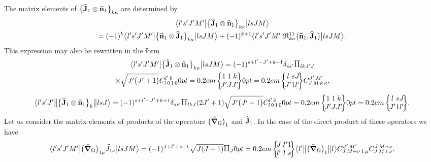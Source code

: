 The matrix elements of \(\bigl\{\widehat{\mathbf{J}}_{1} \otimes \widehat{\mathbf{n}}_{1}\bigr\}_{k \kappa}\) are determined by
\begin{multline}
\bigl\langle  l^{\prime} s^{\prime} J^{\prime} M^{\prime} \big| \bigl\{\widehat{\mathbf{J}}_{1} \otimes \widehat{\mathbf{n}}_{1}\bigr\}_{k \kappa} \big| l s J M \bigr\rangle\\
=(-1)^{k}
\bigl\langle  l^{\prime} s^{\prime} J^{\prime} M^{\prime} \big| \bigl\{\widehat{\mathbf{n}}_{1} \otimes \widehat{\mathbf{J}}_{1}\bigr\}_{k \kappa} \big| l s J M \bigr\rangle+(-1)^{k+1}
\bigl\langle  l^{\prime} s^{\prime} J^{\prime} M^{\prime} \big|  \mathfrak{R}_{k \kappa}^{11}\bigl(\widehat{\mathbf{n}}_{1}, \widehat{\mathbf{J}}_{1}\bigr) \big| l s J M \bigr\rangle . \label{eq:13:2:55}
\end{multline}
This expression may also be rewritten in the form
\begin{multline}
\braOket{ l^{\prime} s^{\prime} J^{\prime} M^{\prime}}{\bigl\{\widehat{\vect{J}}_{1} \otimes \widehat{\vect{n}}_{1}\bigr\}_{k \kappa}}{l s J M}= (-1)^{s+l^{\prime}-J^{\prime}+k+1} \delta_{s s^{\prime}} \Fact{l k J^{\prime} J}\\
\times \sqrt{J^{\prime}\bigl(J^{\prime}+1\bigr)} 
\clebsch{l}{0}{1}{0}{l^{\prime}}{0}
\sixj{1}{1}{k}{J^{\prime}}{J}{J^{\prime}}
\sixj{l}{s}{J}{J^{\prime}}{1}{l^{\prime}}
\clebsch{J}{M}{k}{\kappa}{J^{\prime}}{M^{\prime}}, \label{eq:13:2:56}
\end{multline}
\begin{multline*}
\braOketred{ l^{\prime} s^{\prime} J^{\prime}}{\bigl\{\widehat{\vect{J}}_{1} \otimes \widehat{\vect{n}}_{1}\bigr\}_{k}}{l s J}=(-1)^{s+l^{\prime}-J^{\prime}+k+1} \delta_{s s^{\prime}} \Fact{l k J}(2J^{\prime}+1) \sqrt{J^{\prime}\bigl(J^{\prime}+1\bigr)} 
\clebsch{l}{0}{1}{0}{l^{\prime}}{0}
\sixj{1}{1}{k}{J^{\prime}}{J}{J^{\prime}}
\sixj{l}{s}{J}{J^{\prime}}{1}{l^{\prime}} .
\end{multline*}
Let us consider the matrix elements of products of the operators \(\bigl(\widehat{\boldsymbol{\nabla}}_{\Omega}\bigr)_{1}\) and \(\widehat{\mathbf{J}}_{1}\). In the case of the direct product of these operators we have
\begin{equation}
\braOket{ l^{\prime} s^{\prime} J^{\prime} M^{\prime}}{\bigl(\delop_{\Omega}\bigr)_{1 \mu} \widehat{J}_{1 \nu}}{l s J M}=(-1)^{J+l^{\prime}+s+1} \sqrt{J(J+1)}\Fact{J}
\sixj{J}{J^{\prime}}{1}{l^{\prime}}{l}{s}
\braOketred{ l^{\prime}}{\bigl(\delop_{\Omega}\bigr)_{1}}{ l} 
\clebsch{J}{M+\nu}{1}{\mu}{J^{\prime}}{M^{\prime}} 
\clebsch{J}{M}{1}{\nu}{J}{M+\nu}. \label{eq:13:2:57}
\end{equation}
